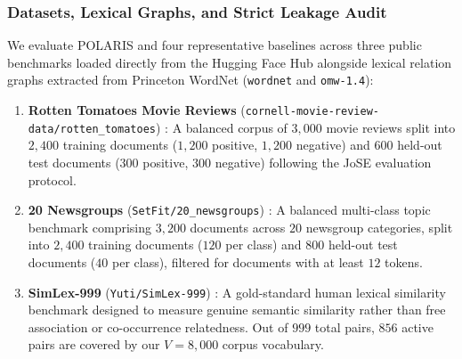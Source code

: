 \documentclass[journal]{IEEEtran}
\begin{document}
\subsubsection{Datasets, Lexical Graphs, and Strict Leakage Audit}
We evaluate POLARIS and four representative baselines across three public benchmarks loaded directly from the Hugging Face Hub alongside lexical relation graphs extracted from Princeton WordNet (\texttt{wordnet} and \texttt{omw-1.4}):
\begin{enumerate}
    \item \textbf{Rotten Tomatoes Movie Reviews} (\texttt{cornell-movie-review-data/rotten\_tomatoes}) \cite{pang2005seeing}: A balanced corpus of $3,000$ movie reviews split into $2,400$ training documents ($1,200$ positive, $1,200$ negative) and $600$ held-out test documents ($300$ positive, $300$ negative) following the JoSE evaluation protocol.
    \item \textbf{20 Newsgroups} (\texttt{SetFit/20\_newsgroups}) \cite{lang1995newsweeder}: A balanced multi-class topic benchmark comprising $3,200$ documents across $20$ newsgroup categories, split into $2,400$ training documents ($120$ per class) and $800$ held-out test documents ($40$ per class), filtered for documents with at least $12$ tokens.
    \item \textbf{SimLex-999} (\texttt{Yuti/SimLex-999}) \cite{hill2015simlex}: A gold-standard human lexical similarity benchmark designed to measure genuine semantic similarity rather than free association or co-occurrence relatedness. Out of $999$ total pairs, $856$ active pairs are covered by our $V = 8,000$ corpus vocabulary.

\end{enumerate}
\end{document}
